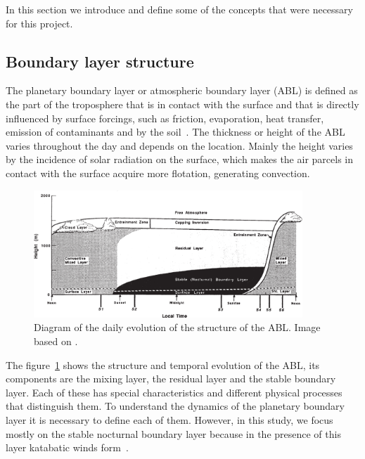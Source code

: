 In this section we introduce and define some of the concepts that were necessary for this project.

\subsection{Boundary layer structure}
The planetary boundary layer or atmospheric boundary layer (ABL) is defined as the part of the troposphere that is in contact with the surface and that is directly influenced by surface forcings, such as friction, evaporation, heat transfer, emission of contaminants and by the soil~\citep{stull2012introduction}. The thickness or height of the ABL varies throughout the day and depends on the location. Mainly the height varies by the incidence of solar radiation on the surface, which makes the air parcels in contact with the surface acquire more flotation, generating convection.

\begin{figure}[ht!]
	\vspace{-5pt}
    \centering
\includegraphics[width=0.9\textwidth]{fig/chapter_2/abl_stull.png}
    \caption{Diagram of the daily evolution of the structure of the ABL. Image based on \cite{stull2012introduction}.}
    \label{fig:ABL_structure}
  \vspace{-5pt}
\end{figure}

The figure~\ref{fig:ABL_structure} shows the structure and temporal evolution of the ABL, its components are the mixing layer, the residual layer and the stable boundary layer. Each of these has special characteristics and different physical processes that distinguish them. To understand the dynamics of the planetary boundary layer it is necessary to define each of them. However, in this study, we focus mostly on the stable nocturnal boundary layer because in the presence of this layer katabatic winds form~\citep{poulos2008observational, stull2012introduction}.

